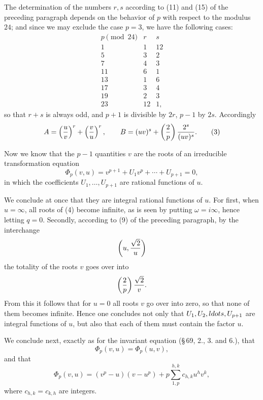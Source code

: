 \documentclass[11pt]{article}
\begin{document}
The determination of the numbers $r,s$ according to (11) and (15) of the preceding paragraph depends on the behavior of $p$ with respect to the modulus $24$; and since we may exclude the case $p=3$, we have the following cases:
\begin{equation}
\begin{array}{c|cc}
 p\pmod{24} & r & s\\
\hline
 1  & 1  & 12\\
 5  & 3  & 2\\
 7  & 4  & 3\\
 11 & 6  & 1\\
 13 & 1  & 6\\
 17 & 3  & 4\\
 19 & 2  & 3\\
 23 & 12 & 1,
\end{array}
\tag{2}
\end{equation}
so that $r+s$ is always odd, and $p+1$ is divisible by $2r$, $p-1$ by $2s$. Accordingly
\begin{equation}
 A=\left({u\over v}\right)^r+\left({v\over u}\right)^r,
 \qquad
 B=(uv)^s+\left({2\over p}\right){2^s\over(uv)^s}.
\tag{3}
\end{equation}

Now we know that the $p-1$ quantities $v$ are the roots of an irreducible transformation equation
\begin{equation}
 \Phi_p(v,u)=v^{p+1}+U_1v^p+\cdots+U_{p+1}=0,
\tag{4}
\end{equation}
in which the coefficients $U_1,\ldots,U_{p+1}$ are rational functions of $u$.

We conclude at once that they are integral rational functions of $u$. For first, when $u=\infty$, all roots of (4) become infinite, as is seen by putting $\omega=i\infty$, hence letting $q=0$. Secondly, according to (9) of the preceding paragraph, by the interchange
\[
 \left(u,{\sqrt2\over u}\right)
\]
the totality of the roots $v$ goes over into
\[
 \left({2\over p}\right){\sqrt2\over v}.
\]
From this it follows that for $u=0$ all roots $v$ go over into zero, so that none of them becomes infinite. Hence one concludes not only that $U_1,U_2,\\ldots,U_{p+1}$ are integral functions of $u$, but also that each of them must contain the factor $u$.

We conclude next, exactly as for the invariant equation (\S\,69, 2., 3. and 6.), that
\begin{equation}
 \Phi_p(v,u)=\Phi_p(u,v),
\tag{5}
\end{equation}
and that
\begin{equation}
 \Phi_p(v,u)=(v^p-u)(v-u^p)
 +p\sum_{1,p}^{h,k} c_{h,k}u^hv^k,
\tag{6}
\end{equation}
where $c_{h,k}=c_{k,h}$ are integers.
\end{document}
